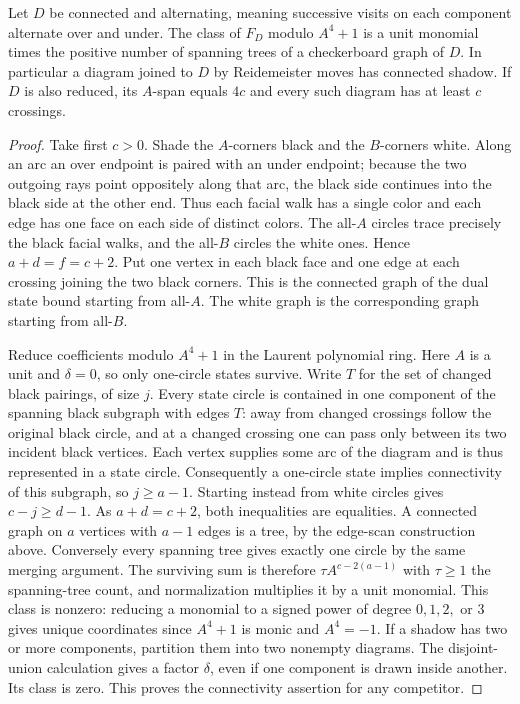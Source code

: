 \begin{theorem}
Let $D$ be connected and alternating, meaning successive visits on each
component alternate over and under. The class of $F_D$ modulo $A^4+1$
is a unit monomial times the positive number of spanning trees of a
checkerboard graph of $D$. In particular a diagram joined to $D$ by
Reidemeister moves has connected shadow. If $D$ is also reduced, its
$A$-span equals $4c$ and every such diagram has at least $c$ crossings.
\end{theorem}
\begin{proof}
Take first $c>0$. Shade the $A$-corners black and the $B$-corners white.
Along an arc an over endpoint is paired with an under endpoint; because
the two outgoing rays point oppositely along that arc, the black side
continues into the black side at the other end. Thus each facial walk
has a single color and each edge has one face on each side of distinct
colors. The all-$A$ circles trace precisely the black facial walks, and
the all-$B$ circles the white ones. Hence $a+d=f=c+2$. Put one vertex
in each black face and one edge at each crossing joining the two black
corners. This is the connected graph of the dual state bound starting
from all-$A$. The white graph is the corresponding graph starting from
all-$B$.

Reduce coefficients modulo $A^4+1$ in the Laurent polynomial ring.
Here $A$ is a unit and $\delta=0$, so only one-circle states survive.
Write $T$ for the set of changed black pairings, of size $j$. Every
state circle is contained in one component of the spanning black subgraph
with edges $T$: away from changed crossings follow the original black
circle, and at a changed crossing one can pass only between its two
incident black vertices. Each vertex supplies some arc of the diagram
and is thus represented in a state circle. Consequently a one-circle
state implies connectivity of this subgraph, so $j\ge a-1$. Starting
instead from white circles gives $c-j\ge d-1$. As $a+d=c+2$, both
inequalities are equalities. A connected graph on $a$ vertices with
$a-1$ edges is a tree, by the edge-scan construction above. Conversely
every spanning tree gives exactly one circle by the same merging argument.
The surviving sum is therefore $\tau A^{c-2(a-1)}$ with $\tau\ge1$ the
spanning-tree count, and normalization multiplies it by a unit monomial.
This class is nonzero: reducing a monomial to a signed power of degree
$0,1,2,$ or $3$ gives unique coordinates since $A^4+1$ is monic and
$A^4=-1$. If a shadow has two or more components, partition them into two
nonempty diagrams. The disjoint-union calculation gives a factor
$\delta$, even if one component is drawn inside another. Its class is
zero. This proves the connectivity assertion for any competitor.


\end{proof}
